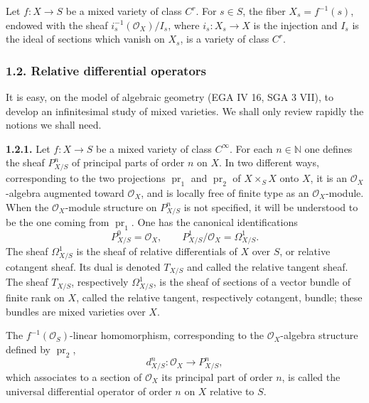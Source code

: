 Let $f:X\to S$ be a mixed variety of class $C^r$. For $s\in S$, the fiber $X_s=f^{-1}(s)$, endowed with the sheaf $i_s^{-1}(\mathcal O_X)/I_s$, where $i_s:X_s\to X$ is the injection and $I_s$ is the ideal of sections which vanish on $X_s$, is a variety of class $C^r$.

\subsubsection*{1.2. Relative differential operators}

It is easy, on the model of algebraic geometry (EGA IV 16, SGA 3 VII), to develop an infinitesimal study of mixed varieties. We shall only review rapidly the notions we shall need.

\textbf{1.2.1.} Let $f:X\to S$ be a mixed variety of class $C^\infty$. For each $n\in\mathbb N$ one defines the sheaf $P^n_{X/S}$ of principal parts of order $n$ on $X$. In two different ways, corresponding to the two projections $\operatorname{pr}_1$ and $\operatorname{pr}_2$ of $X\times_SX$ onto $X$, it is an $\mathcal O_X$-algebra augmented toward $\mathcal O_X$, and is locally free of finite type as an $\mathcal O_X$-module. When the $\mathcal O_X$-module structure on $P^n_{X/S}$ is not specified, it will be understood to be the one coming from $\operatorname{pr}_1$. One has the canonical identifications
\[
 P^0_{X/S}=\mathcal O_X,
 \qquad
 P^1_{X/S}/\mathcal O_X=\Omega^1_{X/S}.
\]
The sheaf $\Omega^1_{X/S}$ is the sheaf of relative differentials of $X$ over $S$, or relative cotangent sheaf. Its dual is denoted $T_{X/S}$ and called the relative tangent sheaf. The sheaf $T_{X/S}$, respectively $\Omega^1_{X/S}$, is the sheaf of sections of a vector bundle of finite rank on $X$, called the relative tangent, respectively cotangent, bundle; these bundles are mixed varieties over $X$.

The $f^{-1}(\mathcal O_S)$-linear homomorphism, corresponding to the $\mathcal O_X$-algebra structure defined by $\operatorname{pr}_2$,
\[
 d^n_{X/S}:\mathcal O_X\longrightarrow P^n_{X/S},
\]
which associates to a section of $\mathcal O_X$ its principal part of order $n$, is called the universal differential operator of order $n$ on $X$ relative to $S$.

